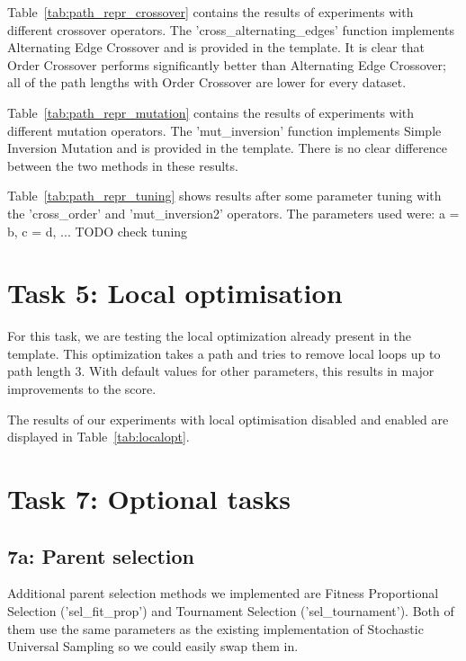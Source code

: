 \documentclass{report}
\begin{document}
Table~\ref{tab:path_repr_crossover} contains the results of experiments with different crossover operators. The 'cross\_alternating\_edges' function implements Alternating Edge Crossover and is provided in the template. It is clear that Order Crossover performs significantly better than Alternating Edge Crossover; all of the path lengths with Order Crossover are lower for every dataset.


Table~\ref{tab:path_repr_mutation} contains the results of experiments with different mutation operators. The 'mut\_inversion' function implements Simple Inversion Mutation and is provided in the template. There is no clear difference between the two methods in these results.


Table~\ref{tab:path_repr_tuning} shows results after some parameter tuning with the 'cross\_order' and 'mut\_inversion2' operators. The parameters used were: a = b, c = d, ... TODO  check tuning




\section{Task 5: Local optimisation}
\label{sec:local}
For this task, we are testing the local optimization already present in the template. This optimization takes a path and tries to remove local loops up to path length 3. With default values for other parameters, this results in major improvements to the score.

The results of our experiments with local optimisation disabled and enabled are displayed in Table~\ref{tab:localopt}.




\section{Task 7: Optional tasks}
\subsection{7a: Parent selection}
Additional parent selection methods we implemented are Fitness Proportional Selection ('sel\_fit\_prop') and Tournament Selection ('sel\_tournament'). Both of them use the same parameters as the existing implementation of Stochastic Universal Sampling so we could easily swap them in.
\end{document}
